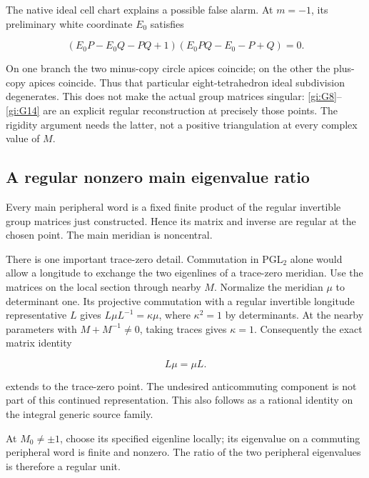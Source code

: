 The native ideal cell chart explains a possible false alarm.
At \(m=-1\), its preliminary white coordinate \(E_0\)
satisfies

\begin{equation}\label{gi:G16}
(E_0P-E_0Q-PQ+1)(E_0PQ-E_0-P+Q)=0.
\end{equation}

On one branch the two minus-copy circle apices coincide; on
the other the plus-copy apices coincide. Thus that particular
eight-tetrahedron ideal subdivision degenerates. This does
not make the actual group matrices singular: \eqref{gi:G8}--\eqref{gi:G14} are
an explicit regular reconstruction at precisely those points.
The rigidity argument needs the latter, not a positive
triangulation at every complex value of \(M\).

\subsection{A regular nonzero main eigenvalue ratio}\label{gi:a-regular-nonzero-main-eigenvalue-ratio}

Every main peripheral word is a fixed finite product of the
regular invertible group matrices just constructed. Hence its
matrix and inverse are regular at the chosen point.
The main meridian is noncentral.

There is one important trace-zero detail. Commutation in
\(\mathrm{PGL}_2\) alone would allow a longitude to
exchange the two eigenlines of a trace-zero meridian.
Use the matrices on the local section through nearby \(M\).
Normalize the meridian \(\mu\) to determinant one.
Its projective commutation with a regular invertible
longitude representative \(L\) gives
\(L\mu L^{-1}=\kappa\mu\), where
\(\kappa^2=1\) by determinants. At the nearby parameters
with \(M+M^{-1}\ne0\), taking traces gives \(\kappa=1\).
Consequently the exact matrix identity

\begin{equation}\label{gi:G16a}
L\mu=\mu L.
\end{equation}

extends to the trace-zero point. The undesired
anticommuting component is not part of this continued
representation. This also follows as a rational identity
on the integral generic source family.

At \(M_0\ne\pm1\), choose
its specified eigenline locally; its eigenvalue on a commuting
peripheral word is finite and nonzero. The ratio of the two
peripheral eigenvalues is therefore a regular unit.

